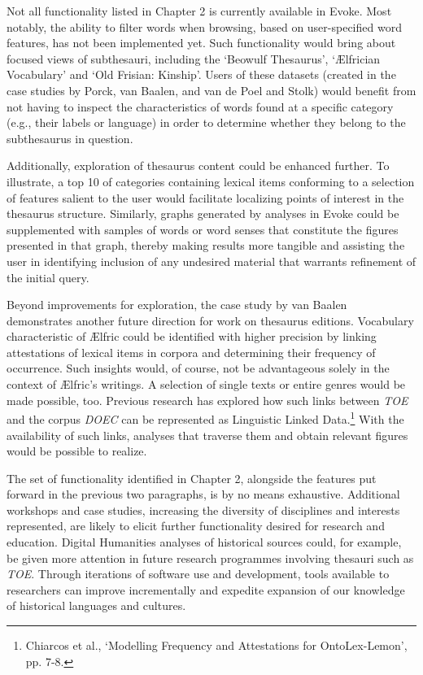 Not all functionality listed in Chapter 2 is currently available in Evoke. Most notably, the ability to filter words when browsing, based on user-specified word features, has not been implemented yet. Such functionality would bring about focused views of subthesauri, including the `Beowulf Thesaurus', `Ælfrician Vocabulary' and `Old Frisian: Kinship'. Users of these datasets (created in the case studies by Porck, van Baalen, and van de Poel and Stolk) would benefit from not having to inspect the characteristics of words found at a specific category (e.g., their labels or language) in order to determine whether they belong to the subthesaurus in question. 

Additionally, exploration of thesaurus content could be enhanced further. To illustrate, a top 10 of categories containing lexical items conforming to a selection of features salient to the user would facilitate localizing points of interest in the thesaurus structure. Similarly, graphs generated by analyses in Evoke could be supplemented with samples of words or word senses that constitute the figures presented in that graph, thereby making results more tangible and assisting the user in identifying inclusion of any undesired material that warrants refinement of the initial query. 

Beyond improvements for exploration, the case study by van Baalen demonstrates another future direction for work on thesaurus editions. Vocabulary characteristic of Ælfric could be identified with higher precision by linking attestations of lexical items in corpora and determining their frequency of occurrence. 
Such insights would, of course, not be advantageous solely in the context of Ælfric's writings. A selection of single texts or entire genres would be made possible, too. 
Previous research has explored how such links between \textit{TOE} and the corpus \textit{DOEC} can be represented as Linguistic Linked Data.\footnote{Chiarcos et al., `Modelling Frequency and Attestations for OntoLex-Lemon', pp. 7-8.} 
With the availability of such links, analyses that traverse them and obtain relevant figures would be possible to realize. 

The set of functionality identified in Chapter 2, alongside the features put forward in the previous two paragraphs, is by no means exhaustive. Additional workshops and case studies, increasing the diversity of disciplines and interests represented, are likely to elicit further functionality desired for research and education. 
Digital Humanities analyses of historical sources could, for example, be given more attention in future research programmes involving thesauri such as \textit{TOE}. 
Through iterations of software use and development, tools available to researchers can improve incrementally and expedite expansion of our knowledge of historical languages and cultures.

